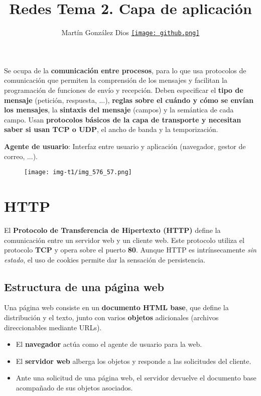 \documentclass{article}
\title{Redes Tema 2. Capa de aplicación}
\author{Martín González Dios 
\href{https://github.com/martindios}{\texttt{[image: github.png]}}}
\begin{document}
\maketitle

Se ocupa de la \textbf{comunicación entre procesos}, para lo que usa protocolos de comunicación que permiten la comprensión de los mensajes y facilitan la programación de funciones de envío y recepción. Deben especificar el \textbf{tipo de mensaje} (petición, respuesta, ...), \textbf{reglas sobre el cuándo y cómo se envían los mensajes}, la \textbf{sintaxis del mensaje} (campos) y la semántica de cada campo. Usan \textbf{protocolos básicos de la capa de transporte y necesitan saber si usan TCP o UDP}, el ancho de banda y la temporización.

\textbf{Agente de usuario}: Interfaz entre usuario y aplicación (navegador, gestor de correo, ...).

\begin{figure}[h]
    \centering
    \texttt{[image: img-t1/img\_576\_57.png]}
\end{figure}

\section{HTTP}

El 	\textbf{Protocolo de Transferencia de Hipertexto (HTTP)} define la comunicación entre un servidor web y un cliente web. Este protocolo utiliza el protocolo \textbf{TCP} y opera sobre el puerto \textbf{80}. Aunque HTTP es intrínsecamente \textit{sin estado}, el uso de cookies permite dar la sensación de persistencia.

\subsection{Estructura de una página web}

Una página web consiste en un \textbf{documento HTML base}, que define la distribución y el texto, junto con varios \textbf{objetos} adicionales (archivos direccionables mediante URLs). 

\begin{itemize}
    \item El \textbf{navegador} actúa como el agente de usuario para la web.
    \item El \textbf{servidor web} alberga los objetos y responde a las solicitudes del cliente.
    \item Ante una solicitud de una página web, el servidor devuelve el documento base acompañado de sus objetos asociados.
\end{itemize}
\end{document}
